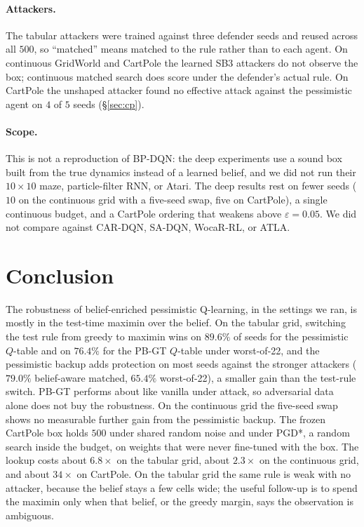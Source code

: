 \documentclass[10pt,twocolumn]{article}
\begin{document}
\paragraph{Attackers.}
The tabular attackers were trained against three defender seeds and reused across all $500$, so ``matched'' means matched to the rule rather than to each agent.
On continuous GridWorld and CartPole the learned SB3 attackers do not observe the box; continuous matched search does score under the defender's actual rule.
On CartPole the unshaped attacker found no effective attack against the pessimistic agent on $4$ of $5$ seeds (\S\ref{sec:cp}).

\paragraph{Scope.}
This is not a reproduction of BP-DQN: the deep experiments use a sound box built from the true dynamics instead of a learned belief, and we did not run their $10{\times}10$ maze, particle-filter RNN, or Atari.
The deep results rest on fewer seeds ($10$ on the continuous grid with a five-seed swap, five on CartPole), a single continuous budget, and a CartPole ordering that weakens above $\varepsilon{=}0.05$.
We did not compare against CAR-DQN, SA-DQN, WocaR-RL, or ATLA.

\section{Conclusion}
\label{sec:conc}

The robustness of belief-enriched pessimistic Q-learning, in the settings we ran, is mostly in the test-time maximin over the belief.
On the tabular grid, switching the test rule from greedy to maximin wins on $89.6\%$ of seeds for the pessimistic $Q$-table and on $76.4\%$ for the PB-GT $Q$-table under worst-of-22, and the pessimistic backup adds protection on most seeds against the stronger attackers ($79.0\%$ belief-aware matched, $65.4\%$ worst-of-22), a smaller gain than the test-rule switch.
PB-GT performs about like vanilla under attack, so adversarial data alone does not buy the robustness.
On the continuous grid the five-seed swap shows no measurable further gain from the pessimistic backup.
The frozen CartPole box holds $500$ under shared random noise and under PGD*, a random search inside the budget, on weights that were never fine-tuned with the box.
The lookup costs about $6.8\times$ on the tabular grid, about $2.3\times$ on the continuous grid, and about $34\times$ on CartPole.
On the tabular grid the same rule is weak with no attacker, because the belief stays a few cells wide; the useful follow-up is to spend the maximin only when that belief, or the greedy margin, says the observation is ambiguous.
\end{document}
